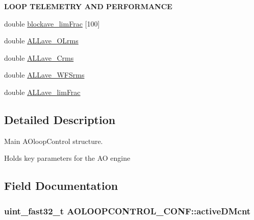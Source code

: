 \begin{Indent}{\bf L\+O\+O\+P T\+E\+L\+E\+M\+E\+T\+R\+Y A\+N\+D P\+E\+R\+F\+O\+R\+M\+A\+N\+C\+E}
\begin{DoxyCompactItemize}
\item 
double \hyperlink{structAOLOOPCONTROL__CONF_a57d81c3036634564f449eb154b196f2c}{blockave\+\_\+lim\+Frac} \mbox{[}100\mbox{]}
\item 
double \hyperlink{structAOLOOPCONTROL__CONF_aca9bae148657e1a388088786ad5f83c0}{A\+L\+Lave\+\_\+\+O\+Lrms}
\item 
double \hyperlink{structAOLOOPCONTROL__CONF_a5ace43e76bae59103b987d9656f56855}{A\+L\+Lave\+\_\+\+Crms}
\item 
double \hyperlink{structAOLOOPCONTROL__CONF_a1f3bdd58a43e759ee638dbe01f8e1f1d}{A\+L\+Lave\+\_\+\+W\+F\+Srms}
\item 
double \hyperlink{structAOLOOPCONTROL__CONF_a30a35a1136e98309290adee3cbf6450f}{A\+L\+Lave\+\_\+lim\+Frac}
\end{DoxyCompactItemize}
\end{Indent}


\subsection{Detailed Description}
Main A\+Oloop\+Control structure. 

Holds key parameters for the A\+O engine 

\subsection{Field Documentation}
\hypertarget{structAOLOOPCONTROL__CONF_a03c39d14c805902e4045617ead77ee9b}{}
\subsubsection[{active\+D\+Mcnt}]{\setlength{\rightskip}{0pt plus 5cm}uint\+\_\+fast32\+\_\+t A\+O\+L\+O\+O\+P\+C\+O\+N\+T\+R\+O\+L\+\_\+\+C\+O\+N\+F\+::active\+D\+Mcnt}\label{structAOLOOPCONTROL__CONF_a03c39d14c805902e4045617ead77ee9b}
\hypertarget{structAOLOOPCONTROL__CONF_aeea125f93585b4ec719064ce68b51133}{}
